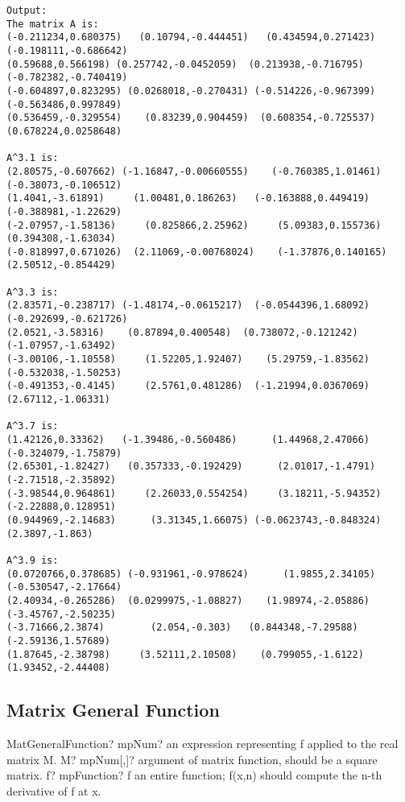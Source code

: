 \begin{verbatim}		
Output:
The matrix A is:
(-0.211234,0.680375)   (0.10794,-0.444451)   (0.434594,0.271423) (-0.198111,-0.686642)
(0.59688,0.566198) (0.257742,-0.0452059)  (0.213938,-0.716795) (-0.782382,-0.740419)
(-0.604897,0.823295) (0.0268018,-0.270431) (-0.514226,-0.967399)  (-0.563486,0.997849)
(0.536459,-0.329554)    (0.83239,0.904459)  (0.608354,-0.725537)  (0.678224,0.0258648)

A^3.1 is:
(2.80575,-0.607662) (-1.16847,-0.00660555)    (-0.760385,1.01461)   (-0.38073,-0.106512)
(1.4041,-3.61891)     (1.00481,0.186263)   (-0.163888,0.449419)   (-0.388981,-1.22629)
(-2.07957,-1.58136)     (0.825866,2.25962)     (5.09383,0.155736)    (0.394308,-1.63034)
(-0.818997,0.671026)  (2.11069,-0.00768024)    (-1.37876,0.140165)    (2.50512,-0.854429)

A^3.3 is:
(2.83571,-0.238717) (-1.48174,-0.0615217)  (-0.0544396,1.68092) (-0.292699,-0.621726)
(2.0521,-3.58316)    (0.87894,0.400548)  (0.738072,-0.121242)   (-1.07957,-1.63492)
(-3.00106,-1.10558)     (1.52205,1.92407)    (5.29759,-1.83562)  (-0.532038,-1.50253)
(-0.491353,-0.4145)     (2.5761,0.481286)  (-1.21994,0.0367069)    (2.67112,-1.06331)

A^3.7 is:
(1.42126,0.33362)   (-1.39486,-0.560486)      (1.44968,2.47066)   (-0.324079,-1.75879)
(2.65301,-1.82427)   (0.357333,-0.192429)      (2.01017,-1.4791)    (-2.71518,-2.35892)
(-3.98544,0.964861)     (2.26033,0.554254)     (3.18211,-5.94352)    (-2.22888,0.128951)
(0.944969,-2.14683)      (3.31345,1.66075) (-0.0623743,-0.848324)        (2.3897,-1.863)

A^3.9 is:
(0.0720766,0.378685) (-0.931961,-0.978624)      (1.9855,2.34105)  (-0.530547,-2.17664)
(2.40934,-0.265286)  (0.0299975,-1.08827)    (1.98974,-2.05886)   (-3.45767,-2.50235)
(-3.71666,2.3874)        (2.054,-0.303)   (0.844348,-7.29588)    (-2.59136,1.57689)
(1.87645,-2.38798)     (3.52111,2.10508)    (0.799055,-1.6122)    (1.93452,-2.44408)
\end{verbatim}



\newpage
\subsection{Matrix General Function}


\begin{mpFunctionsExtract}
	\mpFunctionTwo
	{MatGeneralFunction? mpNum? an expression representing f applied to the real matrix M.}
	{M? mpNum[,]? argument of matrix function, should be a square matrix.}
	{f? mpFunction? f an entire function; f(x,n) should compute the n-th derivative of f at x.}
\end{mpFunctionsExtract}

